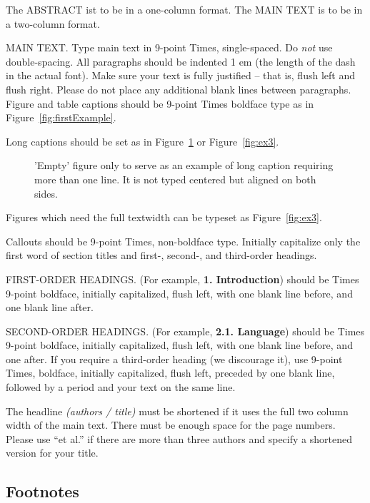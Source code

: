 \documentclass{egpubl-eurovis-short}
\begin{document}
The ABSTRACT ist to be in a one-column format. The MAIN TEXT is to be in a
two-column format.

MAIN TEXT. Type main text in 9-point Times, single-spaced. Do \emph{not} use
double-spacing. All paragraphs should be indented 1 em (the length of the
dash in the actual font). Make sure your text is fully justified -- that is,
flush left and flush right. Please do not place any additional blank lines
between paragraphs. Figure and table captions should be 9-point Times
boldface type as in Figure~\ref{fig:firstExample}.

\noindent Long captions should be set as in Figure~\ref{fig:ex1} or
Figure~\ref{fig:ex3}.

\begin{figure}[htb]
   \caption{\label{fig:ex1}
     'Empty' figure only to serve as an example of long caption requiring 
     more than one line. It is not typed centered but aligned on both sides.}
\end{figure}

\noindent
Figures which need the full textwidth can be typeset as Figure~\ref{fig:ex3}.

\noindent Callouts should be 9-point Times, non-boldface type. Initially
capitalize only the first word of section titles and first-, second-, and
third-order headings.

FIRST-ORDER HEADINGS. (For example, \textbf{1. Introduction}) should be Times
9-point boldface, initially capitalized, flush left, with one blank line
before, and one blank line after.

SECOND-ORDER HEADINGS. (For example, \textbf{2.1. Language}) should be Times
9-point boldface, initially capitalized, flush left, with one blank line
before, and one after. If you require a third-order heading (we discourage
it), use 9-point Times, boldface, initially capitalized, flush left, preceded
by one blank line, followed by a period and your text on the same line.

The headline \emph{(authors / title)} must be shortened if it uses the full 
two column width of the main text.
There must be enough space for the page numbers. Please use ``et al.'' if 
there are more than three authors and specify a shortened version for your title.
\subsection{Footnotes}
\end{document}
